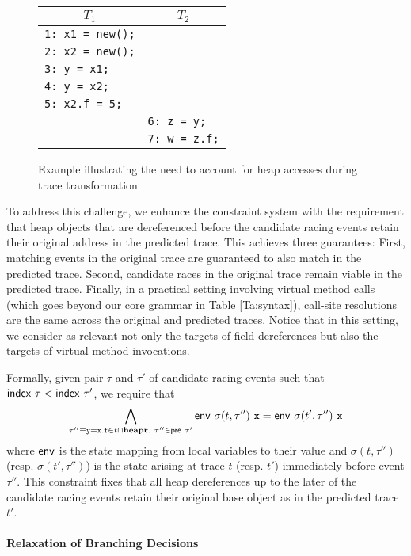 \begin{figure}
	\centering
	\begin{tabular}{ll}
		\hline
		\multicolumn{1}{c}{$T_1$} & \multicolumn{1}{c}{$T_2$} \\
		\hline
		{\tt 1: x1 = new();} & \\
		{\tt 2: x2 = new();} & \\
		{\tt 3: y = x1;} & \\
		{\tt 4: y = x2;} & \\
		{\tt 5: x2.f = 5;} & \\	
		& {\tt 6: z = y;} \\
		& {\tt 7: w = z.f;} \\
	\end{tabular}
	\caption{\label{fig:heapAccess}Example illustrating the need to account for heap accesses during trace transformation}
\end{figure}

To address this challenge, we enhance the constraint system with the requirement that heap objects that are dereferenced before the candidate racing events retain their original address in the predicted trace.
This achieves three guarantees: First, matching events in the original trace are guaranteed to also match in the predicted trace. Second, candidate races in the original trace remain viable in the predicted trace. Finally, in a practical setting involving virtual method calls (which goes beyond our core grammar in Table \ref{Ta:syntax}), call-site resolutions are the same across the original and predicted traces. Notice that in this setting, we consider as relevant not only the targets of field dereferences but also the targets of virtual method invocations.

Formally, given pair $\tau$ and $\tau'$ of candidate racing events such that ${\sf index}\ \tau < {\sf index}\ \tau'$, 
we require that
$$
\bigwedge_{\tau'' \equiv {\tt y=x.f} \in t \cap {\bf heapr}.\
	\tau'' \in {\sf pre}\ \tau'} {\sf env}\ \sigma(t,\tau'')\ {\tt x} = {\sf env}\ \sigma(t',\tau'')\ {\tt x}
$$
where ${\sf env}$ is the state mapping from local variables to their value and $\sigma(t,\tau'')$ 
(resp. $\sigma(t',\tau'')$) is the state arising at trace $t$ (resp. $t'$) immediately before event $\tau''$.
This constraint fixes that all heap dereferences up to the later of the candidate racing events retain their original base object as in the predicted trace $t'$. 

\paragraph{Relaxation of Branching Decisions}

